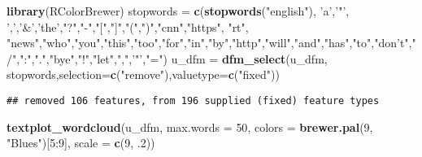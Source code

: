 \documentclass[]{article}
\newenvironment{Shaded}{\begin{snugshade}}{\end{snugshade}}
\newcommand{\KeywordTok}[1]{\textcolor[rgb]{0.13,0.29,0.53}{\textbf{{#1}}}}
\newcommand{\DataTypeTok}[1]{\textcolor[rgb]{0.13,0.29,0.53}{{#1}}}
\newcommand{\DecValTok}[1]{\textcolor[rgb]{0.00,0.00,0.81}{{#1}}}
\newcommand{\StringTok}[1]{\textcolor[rgb]{0.31,0.60,0.02}{{#1}}}
\newcommand{\NormalTok}[1]{{#1}}
\begin{document}
\begin{Shaded}
\begin{Highlighting}[]
\KeywordTok{library}\NormalTok{(RColorBrewer)}
\NormalTok{stopwords =}\StringTok{ }\KeywordTok{c}\NormalTok{(}\KeywordTok{stopwords}\NormalTok{(}\StringTok{"english"}\NormalTok{), }\StringTok{'a'}\NormalTok{,}\StringTok{'"'}\NormalTok{, }\StringTok{','}\NormalTok{,}\StringTok{'&'}\NormalTok{,}\StringTok{'the'}\NormalTok{,}\StringTok{"?"}\NormalTok{,}\StringTok{"-"}\NormalTok{,}\StringTok{"["}\NormalTok{,}\StringTok{"]"}\NormalTok{,}\StringTok{"("}\NormalTok{,}\StringTok{")"}\NormalTok{,}\StringTok{"cnn"}\NormalTok{,}\StringTok{"https"}\NormalTok{, }\StringTok{"rt"}\NormalTok{, }\StringTok{"news"}\NormalTok{,}\StringTok{"who"}\NormalTok{,}\StringTok{"you"}\NormalTok{,}\StringTok{"this"}\NormalTok{,}\StringTok{"too"}\NormalTok{,}\StringTok{"for"}\NormalTok{,}\StringTok{"in"}\NormalTok{,}\StringTok{"by"}\NormalTok{,}\StringTok{"http"}\NormalTok{,}\StringTok{"will"}\NormalTok{,}\StringTok{"and"}\NormalTok{,}\StringTok{"has"}\NormalTok{,}\StringTok{"to"}\NormalTok{,}\StringTok{"don't"}\NormalTok{,}\StringTok{"/"}\NormalTok{,}\StringTok{":"}\NormalTok{,}\StringTok{"."}\NormalTok{,}\StringTok{"bye"}\NormalTok{,}\StringTok{"!"}\NormalTok{,}\StringTok{"let"}\NormalTok{,}\StringTok{","}\NormalTok{,}\StringTok{'"'}\NormalTok{,}\StringTok{"="}\NormalTok{)}
\NormalTok{u_dfm =}\StringTok{ }\KeywordTok{dfm_select}\NormalTok{(u_dfm, stopwords,}\DataTypeTok{selection=}\KeywordTok{c}\NormalTok{(}\StringTok{"remove"}\NormalTok{),}\DataTypeTok{valuetype=}\KeywordTok{c}\NormalTok{(}\StringTok{"fixed"}\NormalTok{))}
\end{Highlighting}
\end{Shaded}

\begin{verbatim}
## removed 106 features, from 196 supplied (fixed) feature types
\end{verbatim}

\begin{Shaded}
\begin{Highlighting}[]
\KeywordTok{textplot_wordcloud}\NormalTok{(u_dfm, }\DataTypeTok{max.words =} \DecValTok{50}\NormalTok{, }\DataTypeTok{colors =} \KeywordTok{brewer.pal}\NormalTok{(}\DecValTok{9}\NormalTok{, }\StringTok{"Blues"}\NormalTok{)[}\DecValTok{5}\NormalTok{:}\DecValTok{9}\NormalTok{], }\DataTypeTok{scale =} \KeywordTok{c}\NormalTok{(}\DecValTok{9}\NormalTok{, .}\DecValTok{2}\NormalTok{))}
\end{Highlighting}
\end{Shaded}
\end{document}
